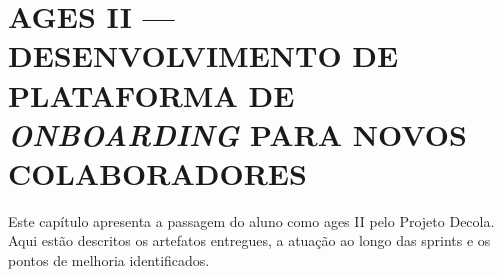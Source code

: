 \chapter[AGES II --- Decola]{AGES II --- DESENVOLVIMENTO DE PLATAFORMA DE \textit{ONBOARDING} PARA NOVOS COLABORADORES}

Este capítulo apresenta a passagem do aluno como \ac{ages} II pelo Projeto Decola. Aqui estão descritos os artefatos entregues, a atuação ao longo das sprints e os pontos de melhoria identificados.




